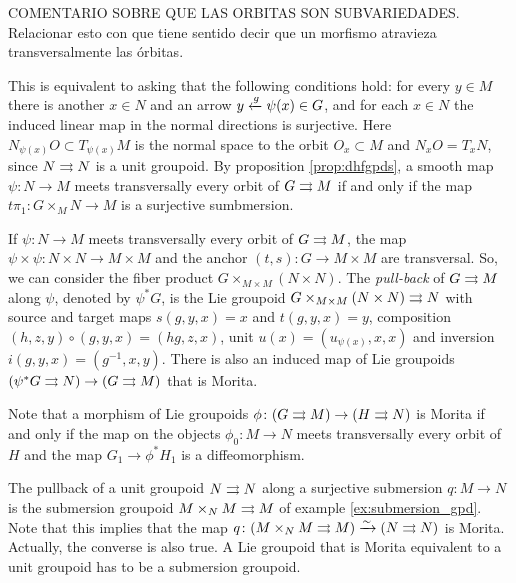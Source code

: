 \noindent COMENTARIO SOBRE QUE LAS ORBITAS SON SUBVARIEDADES.
Relacionar esto con que tiene sentido decir que un morfismo atravieza transversalmente las órbitas.
\medskip

This  is equivalent to asking that the following conditions hold: for every $y\in M$ there is another $x\in N$ and an arrow $\smash{y\xleftarrow{g}\psi(x)}\in G$, and for each $x\in N$ the induced linear map in the normal directions  is surjective.
Here $N_{\psi(x)}O \subset T_{\psi(x)}M$ is the normal space to the orbit $O_x\subset M$ and $N_xO=T_xN$, since $N\rightrightarrows N$ is a unit groupoid.
By proposition \ref{prop:dhfgpds}, a smooth map $\psi\colon N\to M$ meets transversally every orbit of $G\rightrightarrows M$ if and only if the map $t\pi_1\colon G\times_M N\to M$ is a surjective sumbmersion.

If $\psi\colon N\to M$ meets transversally every orbit of $G\rightrightarrows M$, the map $\psi\times\psi\colon N\times N\to M\times M$ and the anchor $(t,s)\colon G\to M\times M$ are transversal.
So, we can consider the fiber product $G\times_{M\times M} (N\times N)$.
The \emph{pull-back} of $G\rightrightarrows M$ along $\psi$, denoted by $\psi^*G$, is the Lie groupoid
\( G\times_{M\times M} (N\times N) \rightrightarrows N \)
with source and target maps $s(g,y,x) = x$ and $t(g,y,x) = y$, composition $(h,z,y)\circ(g,y,x) = (hg,z,x)$, unit $u(x) = (u_{\psi(x)},x,x)$ and inversion $i(g,y,x) = (g^{-1},x,y)$.
There is also an induced map of Lie groupoids
\( (\psi^*G\rightrightarrows N) \to (G\rightrightarrows M) \)
that is Morita.

Note  that a morphism of Lie groupoids $\phi\colon (G\rightrightarrows M)\to (H\rightrightarrows N)$ is Morita if and only if the map on the objects $\phi_0\colon M\to N$ meets transversally every orbit of $H$ and the map $G_1\to \phi^*H_1$ is a diffeomorphism.

\begin{example}\label{ex:submersion_gpd_pb}
The pullback of a unit groupoid $N\rightrightarrows N$ along a surjective submersion $q\colon M\to N$ is the submersion groupoid $M\times_N M\rightrightarrows M$ of example \ref{ex:submersion_gpd}.
Note that this implies that the map
\( q\colon (M\times_N M\rightrightarrows M) \xrightarrow\sim  (N\rightrightarrows N) \)
is Morita.
Actually, the converse is also true.
A Lie groupoid that is Morita equivalent to a unit groupoid has to be a submersion groupoid.
\end{example}

